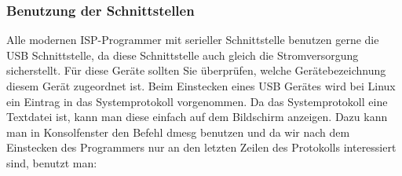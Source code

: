 \subsubsection{Benutzung der Schnittstellen}
\label{sec:Schnittstellen}

Alle modernen ISP-Programmer mit serieller Schnittstelle benutzen gerne die USB Schnittstelle,
da diese Schnittstelle auch gleich die Stromversorgung sicherstellt.
Für diese Geräte sollten Sie überprüfen, welche Gerätebezeichnung
diesem Gerät zugeordnet ist.
Beim Einstecken eines USB Gerätes wird bei Linux ein Eintrag in das
Systemprotokoll vorgenommen.
Da das Systemprotokoll eine Textdatei ist,
kann man diese einfach auf dem Bildschirm anzeigen.
Dazu kann man in Konsolfenster den Befehl dmesg benutzen und da wir nach dem
Einstecken des Programmers nur an den letzten Zeilen des Protokolls
interessiert sind, benutzt man:


